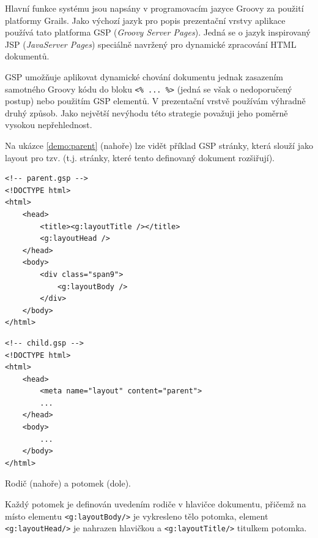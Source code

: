 Hlavní funkce systému jsou napsány v programovacím jazyce Groovy za použití platformy Grails. Jako výchozí jazyk pro popis prezentační vrstvy aplikace používá tato platforma GSP (\textit{Groovy Server Pages}). Jedná se o jazyk inspirovaný JSP (\textit{JavaServer Pages}) speciálně navržený pro dynamické zpracování HTML dokumentů.  \cite{20}

GSP umožňuje aplikovat dynamické chování dokumentu jednak zasazením samotného Groovy kódu do bloku \texttt{<\% ... \%>} (jedná se však o nedoporučený postup) nebo použitím GSP elementů. V prezentační vrstvě používám výhradně druhý způsob. Jako největší nevýhodu této strategie považuji jeho poměrně vysokou nepřehlednost.

Na ukázce \ref{demo:parent} (nahoře) lze vidět příklad GSP stránky, která slouží jako layout pro tzv.  (t.j. stránky, které tento definovaný dokument rozšiřují).

\begin{demo}
    \centering
    \begin{lstlisting}[language=html5]
<!-- parent.gsp -->
<!DOCTYPE html>
<html>
    <head>
        <title><g:layoutTitle /></title>
        <g:layoutHead />
    </head>
    <body>
        <div class="span9">
            <g:layoutBody />
        </div>
    </body>
</html>
    \end{lstlisting}
    \begin{lstlisting}[language=html5]
<!-- child.gsp -->
<!DOCTYPE html>
<html>
    <head>
        <meta name="layout" content="parent">
        ...
    </head>
    <body>
        ...
    </body>
</html>
    \end{lstlisting}
    \caption{Rodič (nahoře) a potomek (dole).}
    \label{demo:parent}
\end{demo}

Každý potomek je definován uvedením rodiče v hlavičce dokumentu, přičemž na místo elementu \texttt{<g:layoutBody/>} je vykresleno tělo potomka, element \texttt{<g:layoutHead/>} je nahrazen hlavičkou a \texttt{<g:layoutTitle/>} titulkem potomka.

